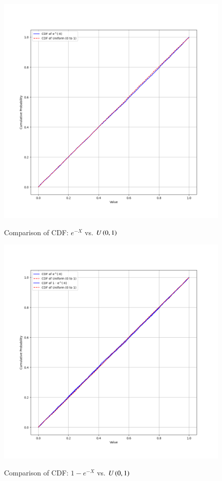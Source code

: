 \documentclass[book,11pt]{IEEEtran}
\begin{document}
\begin{figure}[H]
	\centering
	\includegraphics[width=\columnwidth]{figs/cdf_comp_1.png}
	\label{fig:i_2023/st/53_1}
	\caption{Comparison of CDF: $e^{-X}$ vs. $U\left(0,1\right)$}
\end{figure}
\begin{figure}[H]
	\centering
	\includegraphics[width=\columnwidth]{figs/cdf_comp_2.png}
	\label{fig:i_2023/st/53_2}
	\caption{Comparison of CDF: $1-e^{-X}$ vs. $U\left(0,1\right)$}
\end{figure}
\end{document}
